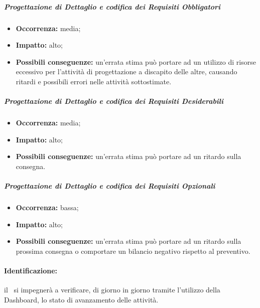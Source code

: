 \documentclass[../PianoProgetto.tex]{subfiles}
\begin{document}
		\subparagraph*{Progettazione di Dettaglio e codifica dei Requisiti Obbligatori}
			\begin{itemize}[label={-}]
				\item \textbf{Occorrenza:} media;
				\item \textbf{Impatto:} alto;
				\item \textbf{Possibili conseguenze:} un'errata stima può portare ad un utilizzo di risorse eccessivo per l'attività di progettazione a discapito delle altre, causando ritardi e possibili errori nelle attività sottostimate. 
			\end{itemize}
			
		\subparagraph*{Progettazione di Dettaglio e codifica dei Requisiti Desiderabili}
			\begin{itemize}[label={-}]
				\item \textbf{Occorrenza:} media;
				\item \textbf{Impatto:} alto;
				\item \textbf{Possibili conseguenze:} un'errata stima può portare ad un ritardo sulla consegna.
			\end{itemize}
			
		\subparagraph*{Progettazione di Dettaglio e codifica dei Requisiti Opzionali}
			\begin{itemize}[label={-}]
				\item \textbf{Occorrenza:} bassa;
				\item \textbf{Impatto:} alto;
				\item \textbf{Possibili conseguenze:} un'errata stima può portare ad un ritardo sulla prossima consegna o comportare un bilancio negativo rispetto al preventivo.
			\end{itemize}
			
	
	\paragraph*{Identificazione:} il \responsabilediprogetto\ si impegnerà a verificare, di giorno in giorno tramite l'utilizzo della Dashboard\g, lo stato di avanzamento delle attività.
	
\end{document}
